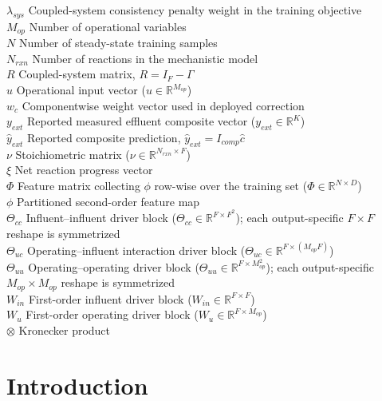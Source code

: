 \documentclass[a4paper,fleqn]{cas-sc}
\DeclareRobustCommand{\currentrev}[1]{{\color{currentRevisionBlue}#1}}
\DeclareRobustCommand{\currentrev}[1]{#1}
\newenvironment{revblockr110}{}{}
\begin{document}
\begin{revblockr110}
\begin{tabbing}
$\lambda_{sys}$ \> Coupled-system consistency penalty weight in the training objective \\
$M_{op}$ \> Number of operational variables \\
$N$ \> Number of steady-state training samples \\
$N_{rxn}$ \> Number of reactions in the mechanistic model \\
$R$ \> Coupled-system matrix, $R = I_F - \Gamma$ \\
$u$ \> Operational input vector ($u \in \mathbb{R}^{M_{op}}$) \\
$w_c$ \> Componentwise weight vector used in deployed correction \\
$y_{ext}$ \> Reported measured effluent composite vector ($y_{ext} \in \mathbb{R}^{K}$) \\
$\hat{y}_{ext}$ \> Reported composite prediction, $\hat{y}_{ext} = I_{comp}\hat{c}$ \\
$\nu$ \> Stoichiometric matrix ($\nu \in \mathbb{R}^{N_{rxn} \times F}$) \\
$\xi$ \> Net reaction progress vector \\
$\Phi$ \> Feature matrix collecting $\phi$ row-wise over the training set ($\Phi \in \mathbb{R}^{N \times D}$) \\
$\phi$ \> Partitioned second-order feature map \\
$\Theta_{cc}$ \> \currentrev{Influent--influent driver block ($\Theta_{cc} \in \mathbb{R}^{F \times F^2}$); each output-specific $F \times F$ reshape is symmetrized} \\
$\Theta_{uc}$ \> Operating--influent interaction driver block ($\Theta_{uc} \in \mathbb{R}^{F \times (M_{op}F)}$) \\
$\Theta_{uu}$ \> \currentrev{Operating--operating driver block ($\Theta_{uu} \in \mathbb{R}^{F \times M_{op}^2}$); each output-specific $M_{op} \times M_{op}$ reshape is symmetrized} \\
$W_{in}$ \> First-order influent driver block ($W_{in} \in \mathbb{R}^{F \times F}$) \\
$W_u$ \> First-order operating driver block ($W_u \in \mathbb{R}^{F \times M_{op}}$) \\
$\otimes$ \> Kronecker product \\
\end{tabbing}
\end{revblockr110}

\section{Introduction}
\end{document}
